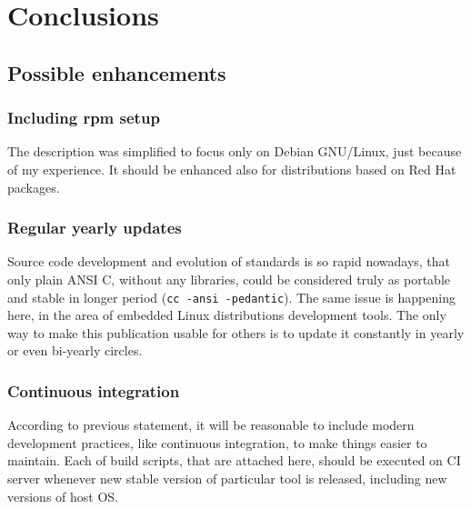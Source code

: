 \documentclass[printmode]{mgr}
\begin{document}





















\chapter{Conclusions}
\label{chapter:conclusions}


\section{Possible enhancements}

\subsection*{Including rpm setup}
The description was simplified to focus only on Debian GNU/Linux, just because of my experience. It should be enhanced also for distributions based on Red Hat packages.


\subsection*{Regular yearly updates}
Source code development and evolution of standards is so rapid nowadays, that only plain ANSI C, without any libraries, could be considered truly as portable and stable in longer period (\verb|cc -ansi -pedantic|).
The same issue is happening here, in the area of embedded Linux distributions development tools.
The only way to make this publication usable for others is to update it constantly in yearly or even bi-yearly circles.

\subsection*{Continuous integration}
According to previous statement, it will be reasonable to include modern development practices, like continuous integration, to make things easier to maintain.
Each of build scripts, that are attached here, should be executed on CI server whenever new stable version of particular tool is released, including new versions of host OS.
\end{document}
